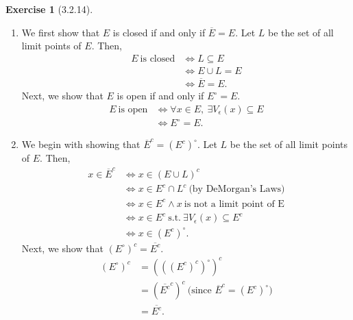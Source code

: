 \documentclass{amsart}
\theoremstyle{definition}
\newtheorem{exercise}{Exercise}
\begin{document}
\begin{exercise}[3.2.14]
  \begin{enumerate}[label={(\alph*)}]
    \item We first show that $E$ is closed if and only if $\overline{E} = E$.
      Let $L$ be the set of all limit points of $E$. Then,
      \begin{align*}
        E\ \text{is closed} &\iff L \subseteq E \\
        &\iff E \cup L = E \\
        &\iff \overline{E} = E.
      \end{align*}
      Next, we show that $E$ is open if and only if $E^\circ = E$.
      \begin{align*}
        E\ \text{is open} &\iff \forall x \in E,\ \exists V_\epsilon(x)
        \subseteq E \\
        &\iff E^\circ = E.
      \end{align*}
    \item We begin with showing that $\overline{E}^c = {(E^c)}^\circ$. Let $L$
      be the set of all limit points of $E$. Then,
      \begin{align*}
        x \in \overline{E}^c &\iff x \in {(E \cup L)}^c \\
        &\iff x \in E^c \cap L^c\ \text{(by DeMorgan's Laws)} \\
        &\iff x \in E^c \wedge x\ \text{is not a limit point of E} \\
        &\iff x \in E^c\ \text{s.t.}\ \exists V_\epsilon(x) \subseteq E^c \\
        &\iff x \in {(E^c)}^\circ.
      \end{align*}
      Next, we show that ${(E^\circ)}^c = \overline{E^c}$.
      \begin{align*}
        {(E^\circ)}^c &= {({({(E^c)}^c)}^\circ)}^c \\
        &= {(\overline{E^c}^c)}^c\ \text{(since $\overline{E}^c =
        {(E^c)}^\circ$)} \\
        &= \overline{E^c}.
      \end{align*}
  \end{enumerate}
\end{exercise}
\end{document}
